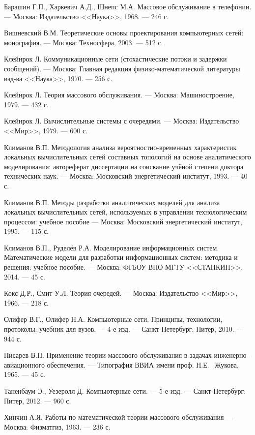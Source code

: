 \documentclass[oneside, draft, 14pt, a4paper]{extreport}
\begin{document}
\renewcommand{\bibname}{\centering Список литературы}
\begin{thebibliography}{00}

 Барашин Г.П., Харкевич А.Д., Шнепс М.А.
Массовое обслуживание в телефонии.
--- Москва: Издательство <<Наука>>, 1968.
--- 246 с.

 Вишневский В.М.
Теоретические основы проектирования компьютерных сетей: монография.
--- Москва: Техносфера, 2003.
--- 512 с.

 Клейнрок Л.
Коммуникационные сети (стохастические потоки и задержки сообщений).
--- Москва: Главная редакция физико-математической литературы изд-ва <<Наука>>, 1970.
--- 256 с.

 Клейнрок Л.
Теория массового обслуживания.
--- Москва: Машиностроение, 1979.
--- 432 с.

 Клейнрок Л.
Вычислительные системы с очередями.
--- Москва: Издательство <<Мир>>, 1979.
--- 600 с.

 Климанов В.П.
Методология анализа вероятностно-временных характеристик локальных вычислительных сетей составных топологий на основе аналитического
моделирования: автореферат диссертации на соискание учёной степени доктора технических наук.
--- Москва: Московский энергетический институт, 1993.
--- 40 с.

 Климанов В.П.
Методы разработки аналитических моделей для анализа локальных вычислительных сетей, используемых в управлении технологическим процессом: учебное пособие
--- Москва: Московский энергетический институт, 1995.
--- 115 с.

 Климанов В.П., Руделёв Р.А.
Моделирование информационных систем. Математические модели для разработки информационных систем: методика и решения: учебное пособие.
--- Москва: ФГБОУ ВПО МГТУ <<СТАНКИН>>, 2014.
--- 45 с.

 Кокс Д.Р., Смит У.Л.
Теория очередей.
--- Москва: Издательство <<Мир>>, 1966.
--- 218 с.

 Олифер В.Г., Олифер Н.А.
Компьютерные сети. Принципы, технологии, протоколы: учебник для вузов.
--- 4-е изд.
--- Санкт-Петербург: Питер, 2010.
--- 944 с.

 Писарев В.Н.
Применение теории массового обслуживания в задачах инженерно-авиационного обеспечения.
--- Типография ВВИА имени проф. Н.Е. ~Жукова, 1965.
--- 45 с.

 Таненбаум Э., Уезеролл Д.
Компьютерные сети.
--- 5-е изд.
--- Санкт-Петербург: Питер, 2012.
--- 960 с.

 Хинчин А.Я.
Работы по математической теории массового обслуживания
--- Москва: Физматгиз, 1963.
--- 236 с.

\end{thebibliography}
\end{document}

